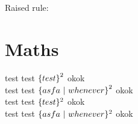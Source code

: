 \\
\\
\\
\\

Raised rule:
\raisedrulefill{4pt}{}

\section{Maths}
test test $\left\{ test \right\}^2$ okok\\
test test $\left\{ asfa \ \middle| \ whenever \right\}^2$ okok\\
test test $\{ test \}^2$ okok\\
test test $\{ asfa \ | \ whenever \}^2$ okok\\

